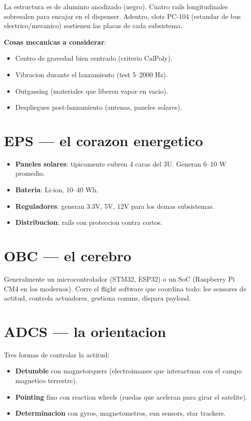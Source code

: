 \documentclass[11pt,a4paper,oneside,openright]{book}
\begin{document}
La estructura es de aluminio anodizado (negro). Cuatro rails
longitudinales sobresalen para encajar en el dispenser. Adentro, slots
PC-104 (estandar de bus electrico/mecanico) sostienen las placas de cada
subsistema.

\textbf{Cosas mecanicas a considerar}:
\begin{itemize}[leftmargin=2em]
  \item Centro de gravedad bien centrado (criterio CalPoly).
  \item Vibracion durante el lanzamiento (test 5--2000 Hz).
  \item Outgassing (materiales que liberen vapor en vacio).
  \item Despliegues post-lanzamiento (antenas, paneles solares).
\end{itemize}

\section{EPS --- el corazon energetico}

\begin{itemize}[leftmargin=2em]
  \item \textbf{Paneles solares}: tipicamente cubren 4 caras del 3U.
        Generan 6--10 W promedio.
  \item \textbf{Bateria}: Li-ion, 10--40 Wh.
  \item \textbf{Reguladores}: generan 3.3V, 5V, 12V para los demas
        subsistemas.
  \item \textbf{Distribucion}: rails con proteccion contra cortos.
\end{itemize}

\section{OBC --- el cerebro}

Generalmente un microcontrolador (STM32, ESP32) o un SoC (Raspberry Pi CM4
en los modernos). Corre el flight software que coordina todo: lee
sensores de actitud, controla actuadores, gestiona comms, dispara payload.

\section{ADCS --- la orientacion}

Tres formas de controlar la actitud:
\begin{itemize}[leftmargin=2em]
  \item \textbf{Detumble} con magnetorquers (electroimanes que interactuan
        con el campo magnetico terrestre).
  \item \textbf{Pointing} fino con reaction wheels (ruedas que aceleran
        para girar el satelite).
  \item \textbf{Determinacion} con gyros, magnetometros, sun sensors, star
        trackers.
\end{itemize}
\end{document}
